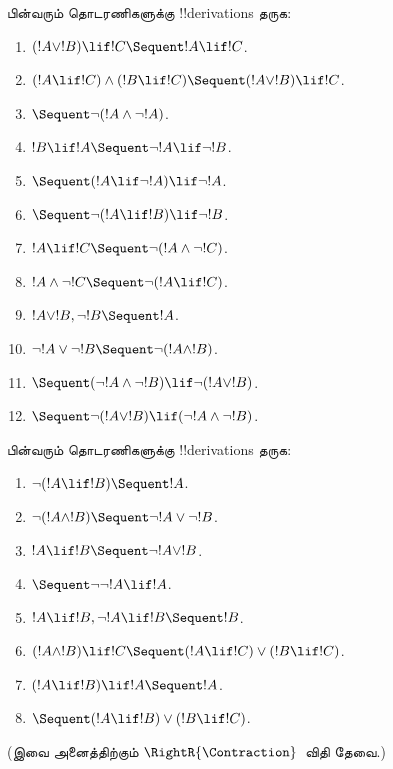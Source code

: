 \documentclass[../../../include/open-logic-section]{subfiles}
\begin{document}
\begin{prob}
பின்வரும் தொடரணிகளுக்கு !!{derivation}s தருக:
\begin{enumerate}
\item $(!A \lor !B) \lif !C \Sequent !A \lif !C$.
\item $(!A \lif !C) \land (!B \lif !C) \Sequent (!A \lor !B) \lif !C$.
\item $\Sequent \lnot(!A \land \lnot !A)$.
\item $!B \lif !A \Sequent \lnot !A \lif \lnot !B$.
\item $\Sequent (!A \lif \lnot !A) \lif \lnot !A$.
\item $\Sequent \lnot(!A \lif !B) \lif \lnot !B$.
\item $!A \lif !C \Sequent \lnot (!A \land \lnot !C)$.
\item $!A \land \lnot !C \Sequent \lnot (!A \lif !C)$.
\item $!A \lor !B, \lnot !B \Sequent !A$.
\item $\lnot !A \lor \lnot !B \Sequent \lnot(!A \land !B)$.
\item $\Sequent (\lnot !A \land \lnot !B) \lif\lnot(!A \lor !B)$.
\item $\Sequent \lnot(!A \lor !B) \lif (\lnot !A \land \lnot !B)$.
\end{enumerate}
\end{prob}

\begin{prob}
பின்வரும் தொடரணிகளுக்கு !!{derivation}s தருக:
\begin{enumerate}
\item $\lnot(!A \lif !B) \Sequent !A$.
\item $\lnot(!A \land !B) \Sequent \lnot !A \lor \lnot !B$.
\item $!A \lif !B \Sequent \lnot !A \lor !B$.
\item $\Sequent \lnot \lnot !A \lif !A$.
\item $!A \lif !B, \lnot !A \lif !B \Sequent !B$.
\item $(!A \land !B) \lif !C \Sequent (!A \lif !C) \lor (!B \lif !C)$.
\item $(!A \lif !B) \lif !A \Sequent !A$.
\item $\Sequent (!A \lif !B) \lor (!B \lif !C)$.
\end{enumerate}
(இவை அனைத்திற்கும் $\RightR{\Contraction}$~விதி தேவை.)
\end{prob}
\end{document}
